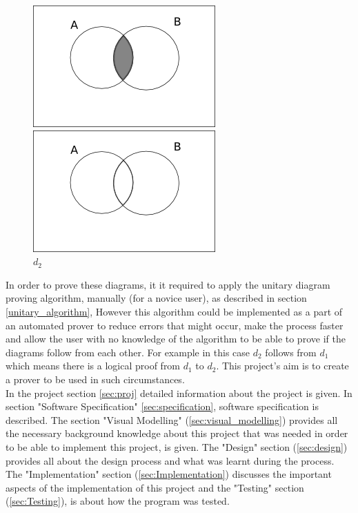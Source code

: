 \documentclass[10pt, a4paper, titlepage]{article}
\begin{document}
\begin{figure}[h]
\begin{minipage}[h]{0.5\linewidth}
\centering
\includegraphics[scale=0.5]{images/d1.png}
\caption{$d_{1}$}
\label{fig:d1demo}
\end{minipage}
\hspace{0.5cm}
\begin{minipage}[h]{0.5\linewidth}
\centering
\includegraphics[scale=0.5]{images/d2.png}
\caption{$d_{2}$}
\label{fig:d2demo}
\end{minipage}
\end{figure}

In order to prove these diagrams, it it required to apply the unitary diagram proving algorithm, manually (for a novice user), as described in section \ref{unitary_algorithm}, However this algorithm could be implemented as a part of an automated prover to reduce errors that might occur, make the process faster and allow the user with no knowledge of the algorithm to be able to prove if the diagrams follow from each other. For example in this case $ d_{2} $ follows from $ d_{1} $ which means there is a logical proof from $ d_{1} $ to $ d_{2} $. This project's aim is to create a prover to be used in such circumstances.\\

In the project section \ref{sec:proj} detailed information about the project is given. In section  "Software Specification" \ref{sec:specification}, software specification is described.  The section "Visual Modelling" (\ref{sec:visual_modelling}) provides  all the necessary background knowledge about this project that was needed in order to be able to implement this project, is given. The "Design" section (\ref{sec:design}) provides all about the design process and what was learnt during the process. The "Implementation" section (\ref{sec:Implementation}) discusses the important aspects of the implementation of this project and the "Testing" section (\ref{sec:Testing}), is about how the program was tested.
 
\end{document}
